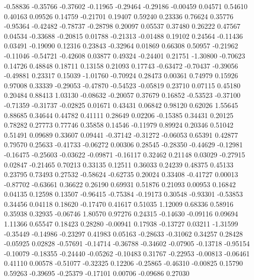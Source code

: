   -0.58836 -0.35766
  -0.37602 -0.11965
  -0.29464 -0.29186
  -0.00459  0.04571
   0.54610  0.40163
   0.09526  0.14759
  -0.21701  0.19407
   0.59240  0.23336
   0.76624  0.35776
  -0.95364 -0.42482
  -0.78737 -0.28798
   0.20097  0.05537
   0.37480  0.26222
   0.47567  0.04534
  -0.33688 -0.20815
   0.01788 -0.21313
  -0.01488  0.19102
   0.24564 -0.11436
   0.03491 -0.19090
   0.12316  0.23843
  -0.32964  0.01869
   0.66308  0.50957
  -0.21962 -0.11046
  -0.54721 -0.42608
   0.03877  0.49324
  -0.24401  0.21751
  -1.30800 -0.70623
   0.14726  0.48848
   0.18711  0.13158
   0.21093  0.17743
  -0.63472 -0.70437
  -0.39056 -0.49881
   0.23317  0.15039
  -1.01760 -0.70924
   0.28473  0.00361
   0.74979  0.15926
   0.97008  0.33339
  -0.29053 -0.47870
  -0.54523 -0.05819
   0.23710  0.07115
   0.45180  0.20484
   0.88413  1.03130
  -0.08632 -0.20057
   0.37679  0.16852
  -0.53523 -0.37100
  -0.71359 -0.31737
  -0.02825  0.01671
   0.43431  0.06842
   0.98120  0.62026
   1.55645  0.88685
   0.34644  0.44782
   0.41111  0.28649
   0.02206 -0.15385
   0.34431  0.20125
   0.78282  0.27773
   0.77746  0.35858
   0.14546 -0.11979
   0.89924  0.20346
   0.51042  0.51491
   0.09689  0.33607
   0.09441 -0.37142
  -0.31272 -0.06053
   0.65391  0.42877
   0.79570  0.25633
  -0.41733 -0.06272
   0.00306  0.28545
  -0.28350 -0.44629
  -0.12981 -0.16475
  -0.25603 -0.03622
  -0.09871 -0.16117
   0.32462  0.21148
   0.03029 -0.27915
   0.02847 -0.21465
   0.70213  0.33135
   0.12511  0.36033
   0.24239  0.48375
   0.45133  0.23795
   0.73493  0.27532
  -0.58624 -0.62735
   0.20024  0.33408
  -0.41727  0.00013
  -0.87702 -0.63661
   0.36622  0.26190
   0.69931  0.51876
   0.21093  0.00953
   0.16842  0.04135
   0.12598  0.13507
  -0.96415 -0.75384
  -0.19173  0.30548
  -0.93301 -0.53853
   0.34456  0.04118
   0.18620 -0.17470
   0.41617  0.51035
   1.12009  0.68336
   0.58916  0.35938
   0.32935 -0.06746
   1.80570  0.97276
   0.24315 -0.14630
  -0.09116  0.09694
   1.11366  0.65547
   0.18423  0.28280
  -0.00941  0.17938
  -0.13727  0.03211
  -1.31599 -0.35449
  -0.14986 -0.23297
   0.41983  0.05163
  -0.28633 -0.31062
   0.34257  0.28428
  -0.05925  0.02828
  -0.57691 -0.14714
  -0.36788 -0.34602
  -0.07905 -0.13718
  -0.95154 -0.10079
  -0.18355 -0.24440
  -0.05262 -0.10483
   0.31767 -0.22953
  -0.00813 -0.06461
   0.41110  0.00578
  -0.51077 -0.32325
   0.12206 -0.25865
  -0.46310 -0.00825
   0.15790  0.59263
  -0.39695 -0.25379
  -0.17101  0.00706
  -0.09686  0.27030
